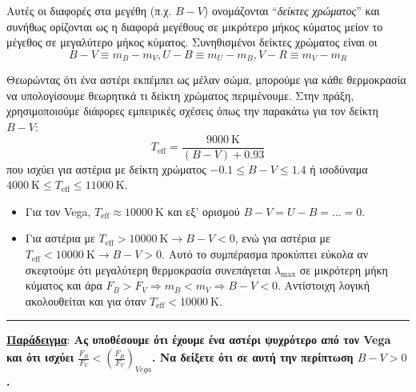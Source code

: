 Αυτές οι διαφορές στα μεγέθη (π.χ. $B - V$) ονομάζονται ``\textit{δείκτες χρώματος}'' και συνήθως ορίζονται ως η διαφορά μεγέθους σε μικρότερο μήκος κύματος μείον το μέγεθος σε μεγαλύτερο μήκος κύματος. Συνηθισμένοι δείκτες χρώματος είναι οι $$B - V \equiv m_B - m_V, U - B \equiv m_U - m_B, V - R \equiv m_V - m_R$$

Θεωρώντας ότι ένα αστέρι εκπέμπει ως μέλαν σώμα, μπορούμε για κάθε θερμοκρασία να υπολογίσουμε θεωρητικά τι δείκτη χρώματος περιμένουμε. Στην πράξη, χρησιμοποιούμε διάφορες εμπειρικές σχέσεις όπως την παρακάτω για τον δείκτη $B-V$: 
\begin{equation}
    T_{\text{eff}} = \frac{9000 \ \text{K}}{(B - V) + 0.93}
\end{equation}
που ισχύει για αστέρια με δείκτη χρώματος $-0.1 \leq B-V \leq 1.4$ ή ισοδύναμα $4000 \ \text{K} \leq T_{\text{eff}} \leq 11000 \ \text{K}$.

\begin{itemize}
    \item Για τον Vega, $T_{\text{eff}} \approx 10000 \ \text{K}$ και εξ' ορισμού $B-V = U-B = \dots = 0$.
    \item Για αστέρια με $T_{\text{eff}} > 10000 \ \text{K} \longrightarrow B-V < 0$, ενώ για αστέρια με $T_{\text{eff}} < 10000 \ \text{K} \longrightarrow B-V > 0$. Αυτό το συμπέρασμα προκύπτει εύκολα αν σκεφτούμε ότι μεγαλύτερη θερμοκρασία συνεπάγεται $\lambda_{\text{max}}$ σε μικρότερη μήκη κύματος και άρα $F_B > F_V \Rightarrow m_B < m_V \Rightarrow B-V < 0$. Αντίστοιχη λογική ακολουθείται και για όταν $T_{\text{eff}} < 10000 \ \text{K}$.
\end{itemize}

\hrule
\underline{\textbf{Παράδειγμα}}:
\textbf{Ας υποθέσουμε ότι έχουμε ένα αστέρι ψυχρότερο από τον Vega και ότι ισχύει $\displaystyle \frac{F_B}{F_V} < \left( \frac{F_B}{F_V} \right)_{Vega}$. Να δείξετε ότι σε αυτή την περίπτωση $B-V > 0$.}


